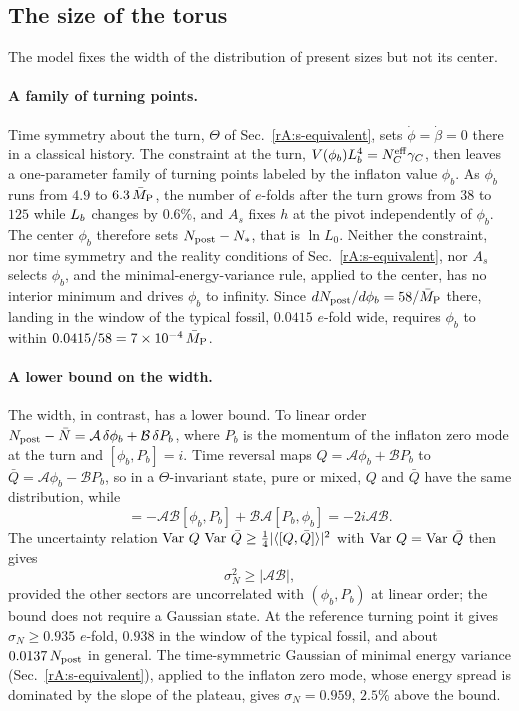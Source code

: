 \subsection{The size of the torus}
\label{rA:c-size}

The model fixes the width of the distribution of present sizes but not its center.

\paragraph{A family of turning points.}
Time symmetry about the turn, $\Theta$ of Sec.~\ref{rA:s-equivalent}, sets $\dot\phi=\dot\beta=0$ there in a classical history.
The constraint at the turn, $V(\phi_b)L_b^4=N_C^{\mathrm{eff}}\gamma_C$, then leaves a one-parameter family of turning points labeled by the inflaton value $\phi_b$.
As $\phi_b$ runs from $4.9$ to $6.3\,\bar M_{\mathrm{P}}$, the number of $e$-folds after the turn grows from $38$ to $125$ while $L_b$ changes by $0.6\%$, and $A_s$ fixes $h$ at the pivot independently of $\phi_b$. %
The center $\phi_b$ therefore sets $N_{\rm post}-N_*$, that is $\ln L_0$.
Neither the constraint, nor time symmetry and the reality conditions of Sec.~\ref{rA:s-equivalent}, nor $A_s$ selects $\phi_b$, and the minimal-energy-variance rule, applied to the center, has no interior minimum and drives $\phi_b$ to infinity.
Since $dN_{\rm post}/d\phi_b=58/\bar M_{\mathrm{P}}$ there, landing in the window of the typical fossil, $0.0415$ $e$-fold wide, requires $\phi_b$ to within $0.0415/58=7\times10^{-4}\,\bar M_{\mathrm{P}}$. %

\paragraph{A lower bound on the width.}
The width, in contrast, has a lower bound.
To linear order $N_{\rm post}-\bar N=\mathcal A\,\delta\phi_b+\mathcal B\,\delta P_b$, where $P_b$ is the momentum of the inflaton zero mode at the turn and $[\phi_b,P_b]=i$.
Time reversal maps $Q=\mathcal A\phi_b+\mathcal BP_b$ to $\bar Q=\mathcal A\phi_b-\mathcal BP_b$, so in a $\Theta$-invariant state, pure or mixed, $Q$ and $\bar Q$ have the same distribution, while
\begin{equation}
[Q,\bar Q]=-\mathcal A\mathcal B[\phi_b,P_b]+\mathcal B\mathcal A[P_b,\phi_b]=-2i\mathcal A\mathcal B .
\end{equation}
The uncertainty relation $\operatorname{Var}\,Q\,\operatorname{Var}\,\bar Q\geq\tfrac14|\langle[Q,\bar Q]\rangle|^2$ with $\operatorname{Var}\,Q=\operatorname{Var}\,\bar Q$ then gives
\begin{equation}
\sigma_N^2\geq|\mathcal A\mathcal B|,
\label{eq:rA-sizebound}
\end{equation}
provided the other sectors are uncorrelated with $(\phi_b,P_b)$ at linear order; the bound does not require a Gaussian state.
At the reference turning point it gives $\sigma_N\geq0.935$ $e$-fold, $0.938$ in the window of the typical fossil, and about $0.0137\,N_{\rm post}$ in general. %
The time-symmetric Gaussian of minimal energy variance (Sec.~\ref{rA:s-equivalent}), applied to the inflaton zero mode, whose energy spread is dominated by the slope of the plateau, gives $\sigma_N=0.959$, $2.5\%$ above the bound. %

